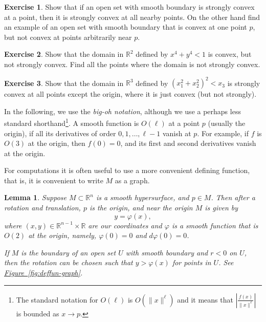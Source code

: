 \documentclass[12pt,openany]{book}
\newcommand{\snorm}[1]{\lVert {#1} \rVert}
\newcommand{\abs}[1]{\left\lvert {#1} \right\rvert}
\newcommand{\R}{{\mathbb{R}}}
\newcommand{\myindex}[1]{#1\index{#1}}
\theoremstyle{plain}
\newtheorem{lemma}[thm]{Lemma}
\theoremstyle{remark}
\theoremstyle{definition}
\newenvironment{exbox}{%
    \def\FrameCommand{\vrule width 1pt \relax\hspace{10pt}}%
    \MakeFramed{\advance\hsize-\width\FrameRestore}%
}{%
    \endMakeFramed
}
\theoremstyle{exercise}
\newtheorem{exercise}{Exercise}[section]
\theoremstyle{example}
\newcommand{\figureref}[1]{\hyperref[#1]{Figure~\ref*{#1}}}
\begin{document}
\begin{exbox}
\begin{exercise}
Show that if an open set with smooth boundary is strongly convex at a point, then it is
strongly convex at all nearby points.  On the other hand find an example of
an open set with smooth boundary that is convex at one point $p$, but not convex at points
arbitrarily near $p$.
\end{exercise}

\begin{exercise}
Show that the domain in $\R^2$ defined by $x^4+y^4 < 1$ is convex, but not strongly convex.
Find all the points where the domain is not strongly convex.
\end{exercise}

\begin{exercise}
Show that the domain in $\R^3$ defined by ${(x_1^2+x_2^2)}^2 < x_3$ is
strongly convex at all points except the origin, where it is just convex
(but not strongly).
\end{exercise}
\end{exbox}

In the following, %
we use the \emph{\myindex{big-oh notation}},
although we use a perhaps less standard shorthand\footnote{%
The standard notation for $O(\ell)$ is $O(\snorm{x}^{\ell})$ and
it means that
$\abs{\frac{f(x)}{\snorm{x}^\ell}}$ is bounded as $x \to p$.}.
A smooth function is $O(\ell)$ at a point $p$ (usually the origin),
if all its derivatives of order $0, 1, \ldots,  \ell-1$ vanish at $p$.
For example, if $f$ is $O(3)$ at the origin,
then $f(0)=0$, and its first and second derivatives vanish at the origin.

For computations it is often useful to use a more convenient
defining function, that is, it is convenient to write $M$ as a graph.

\begin{lemma} \label{lemma:realgraphcoords}
Suppose $M \subset \R^n$ is a smooth hypersurface, 
and $p \in M$.  Then after a rotation and translation, 
$p$ is the origin, and near the origin $M$ is given by
\begin{equation*}
y = \varphi(x) ,
\end{equation*}
where $(x,y) \in \R^{n-1} \times \R$ are our coordinates and
$\varphi$ is a smooth %
function that is $O(2)$ at the origin,
namely, $\varphi(0) = 0$ and $d\varphi(0) = 0$.

If $M$ is the boundary of an open set $U$ with smooth boundary and
$r < 0$ on $U$,
then the rotation can be chosen
such that 
$y > \varphi(x)$
for points in $U$.
See \figureref{fig:deffun-graph}.
\end{lemma}
\end{document}
